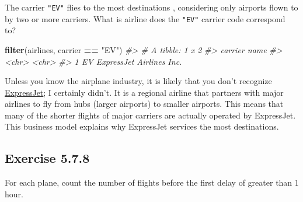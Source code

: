 \documentclass[]{book}
\newenvironment{Shaded}{\begin{snugshade}}{\end{snugshade}}
\newcommand{\CommentTok}[1]{\textcolor[rgb]{0.56,0.35,0.01}{\textit{#1}}}
\newcommand{\DataTypeTok}[1]{\textcolor[rgb]{0.13,0.29,0.53}{#1}}
\newcommand{\DecValTok}[1]{\textcolor[rgb]{0.00,0.00,0.81}{#1}}
\newcommand{\KeywordTok}[1]{\textcolor[rgb]{0.13,0.29,0.53}{\textbf{#1}}}
\newcommand{\NormalTok}[1]{#1}
\newcommand{\OperatorTok}[1]{\textcolor[rgb]{0.81,0.36,0.00}{\textbf{#1}}}
\newcommand{\OtherTok}[1]{\textcolor[rgb]{0.56,0.35,0.01}{#1}}
\newcommand{\StringTok}[1]{\textcolor[rgb]{0.31,0.60,0.02}{#1}}
\theoremstyle{plain}
\theoremstyle{remark}
\begin{document}
The carrier \texttt{"EV"} flies to the most destinations , considering
only airports flown to by two or more carriers. What is airline does the
\texttt{"EV"} carrier code correspond to?

\begin{Shaded}
\begin{Highlighting}[]
\KeywordTok{filter}\NormalTok{(airlines, carrier }\OperatorTok{==}\StringTok{ "EV"}\NormalTok{)}
\CommentTok{#> # A tibble: 1 x 2}
\CommentTok{#>   carrier name                    }
\CommentTok{#>   <chr>   <chr>                   }
\CommentTok{#> 1 EV      ExpressJet Airlines Inc.}
\end{Highlighting}
\end{Shaded}

Unless you know the airplane industry, it is likely that you don't
recognize \href{https://en.wikipedia.org/wiki/ExpressJet}{ExpressJet}; I
certainly didn't. It is a regional airline that partners with major
airlines to fly from hubs (larger airports) to smaller airports. This
means that many of the shorter flights of major carriers are actually
operated by ExpressJet. This business model explains why ExpressJet
services the most destinations.

\hypertarget{exercise-5.7.8}{%
\subsection*{\texorpdfstring{Exercise
{5.7.8}}{Exercise 5.7.8}}\label{exercise-5.7.8}}

For each plane, count the number of flights before the first delay of
greater than 1 hour.

\begin{Shaded}
\end{Shaded}
\end{document}
